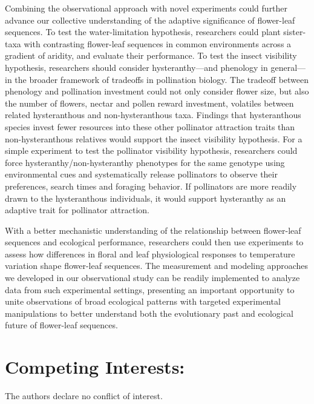 \documentclass{article}[12pt]
\begin{document}
{{Combining the observational approach with novel experiments could further advance our collective understanding of the adaptive significance of flower-leaf sequences. %
To test the water-limitation hypothesis, researchers could plant sister-taxa with contrasting flower-leaf sequences in common environments across a gradient of aridity, and evaluate their performance. To test the insect visibility hypothesis, researchers should consider hysteranthy---and phenology in general---in the broader framework of tradeoffs in pollination biology. The tradeoff between phenology and pollination investment could not only consider flower size, but also the number of flowers, nectar and pollen reward investment, volatiles between related hysteranthous and non-hysteranthous taxa. Findings that hysteranthous species invest fewer resources into these other pollinator attraction traits than non-hysteranthous relatives would support the insect visibility hypothesis. For a simple experiment to test the pollinator visibility hypothesis, researchers could force hysteranthy/non-hysteranthy phenotypes for the same genotype using environmental cues and systematically release pollinators to observe their preferences, search times and foraging behavior. If pollinators are more readily drawn to the hysteranthous individuals, it would support hysteranthy as an adaptive trait for pollinator attraction. 

With a better mechanistic understanding of the relationship between flower-leaf sequences and ecological performance, researchers could then use experiments to assess how differences in floral and leaf physiological responses to temperature variation shape flower-leaf sequences. The measurement and modeling approaches we developed in our observational study can be readily implemented to analyze data from such experimental settings, presenting an important opportunity to unite observations of broad ecological patterns with targeted experimental manipulations to better understand both the evolutionary past and ecological future of flower-leaf sequences.


\section*{Competing Interests:}
The authors declare no conflict of interest.

}}
\end{document}
